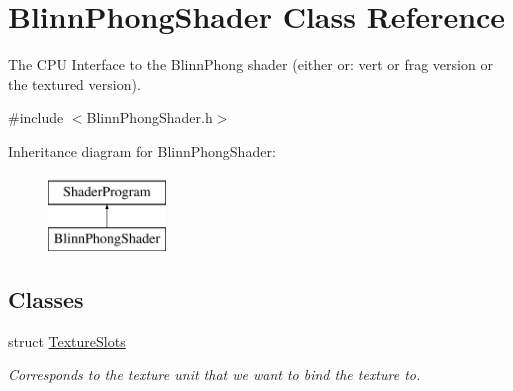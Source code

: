 \hypertarget{class_blinn_phong_shader}{}\section{Blinn\+Phong\+Shader Class Reference}
\label{class_blinn_phong_shader}


The C\+P\+U Interface to the Blinn\+Phong shader (either or\+: vert or frag version or the textured version).  




{\ttfamily \#include $<$Blinn\+Phong\+Shader.\+h$>$}

Inheritance diagram for Blinn\+Phong\+Shader\+:\begin{figure}[H]
\begin{center}
\leavevmode
\includegraphics[height=2.000000cm]{class_blinn_phong_shader}
\end{center}
\end{figure}
\subsection*{Classes}
\begin{DoxyCompactItemize}
\item 
struct \hyperlink{struct_blinn_phong_shader_1_1_texture_slots}{Texture\+Slots}
\begin{DoxyCompactList}\small\item\em Corresponds to the texture unit that we want to bind the texture to. \end{DoxyCompactList}\end{DoxyCompactItemize}

